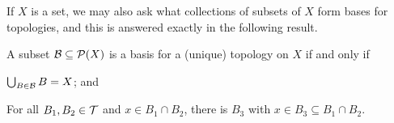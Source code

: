 \documentclass[11pt]{article}
\begin{document}
If $X$ is a set, we may also ask what collections of subsets of $X$ form bases for topologies, and this is answered exactly in the following result.
\begin{proposition}
    A subset $\mathcal{B} \subseteq \mathcal{P}(X)$ is a basis for a (unique) topology on $X$ if and only if
    \begin{enum}
        \item $\bigcup_{B \in \mathcal{B}}B = X$; and
        \item For all $B_1, B_2 \in \mathcal{T}$ and $x \in B_1 \cap B_2$, there is $B_3$ with $x \in B_3 \subseteq B_1 \cap B_2$.
    \end{enum}
\end{proposition}
\end{document}
